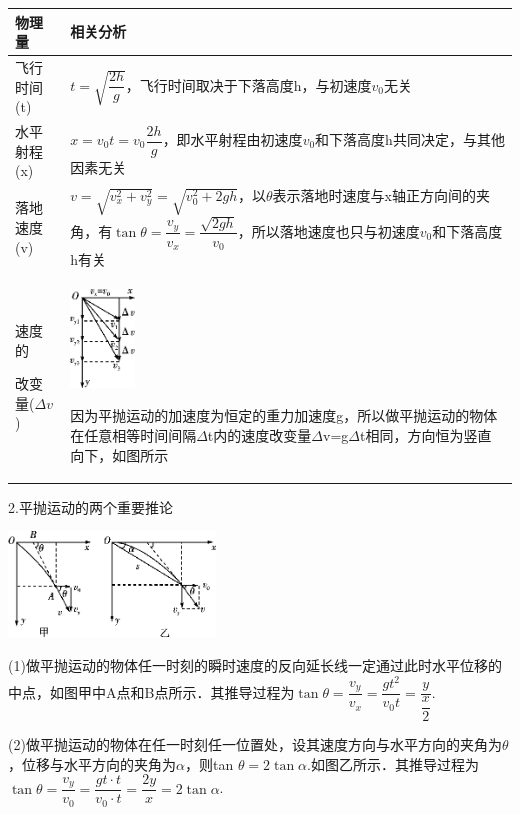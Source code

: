 \begin{longtable}[]{@{}m{2cm}m{10cm}@{}}
\toprule
物理量 & 相关分析\tabularnewline
\midrule
\endhead
飞行时间(t) 
&
$t=\sqrt{\dfrac{2h}{g}}$，飞行时间取决于下落高度h，与初速度$v_0$无关\tabularnewline
水平射程(x) 
&
$x=v_0t=v_0\dfrac{2h}{g}$，即水平射程由初速度$v_0$和下落高度h共同决定，与其他因素无关\tabularnewline
落地速度(v) 
& $v=\sqrt{v_x^2+v_y^2}=\sqrt{v_0^2+2gh}$，以$\theta$表示落地时速度与x轴正方向间的夹角，有$\tan\theta=\dfrac{v_y}{v_x} =\dfrac{\sqrt{2gh}}{v_0} $，所以落地速度也只与初速度$v_0$和下落高度h有关\tabularnewline

速度的

改变量($\Delta v$)
& \begin{minipage}[t]{0.7\columnwidth}\raggedright
\includegraphics[width=0.67708in,height=1.03125in]{media/image161.png}

因为平抛运动的加速度为恒定的重力加速度g，所以做平抛运动的物体在任意相等时间间隔$\Delta$t内的速度改变量$\Delta$v=g$\Delta$t相同，方向恒为竖直向下，如图所示\strut
\end{minipage}\tabularnewline
\bottomrule
\end{longtable}

2.平抛运动的两个重要推论

\begin{center}\includegraphics[width=2.16667in,height=1.10417in]{media/image162.png}
	
\end{center}

(1)做平抛运动的物体任一时刻的瞬时速度的反向延长线一定通过此时水平位移的中点，如图甲中A点和B点所示．其推导过程为$\tan \theta=\dfrac{v_{y}}{v_{x}}=\dfrac{g t^{2}}{v_{0} t}=\dfrac{y}{\dfrac{x}{2}}$.

(2)做平抛运动的物体在任一时刻任一位置处，设其速度方向与水平方向的夹角为$\theta$，位移与水平方向的夹角为$\alpha$，则tan
$\theta=2\tan \alpha$.如图乙所示．其推导过程为$\tan\theta=\dfrac{v_{y}}{v_{0}}=\dfrac{g t \cdot t}{v_{0} \cdot t}=\dfrac{2 y}{x}=2 \tan \alpha$.

